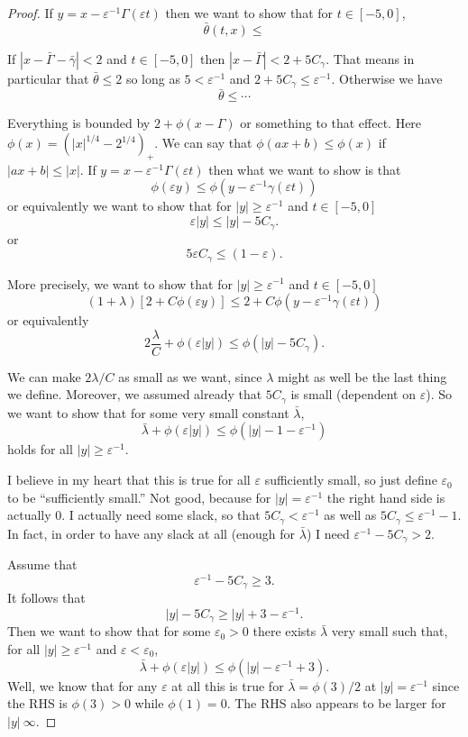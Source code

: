 \documentclass[11pt]{amsart}
\theoremstyle{remark}
\newcommand{\eps}{\varepsilon}
\newcommand{\bracket}[1]{\left[ #1 \right]}
\newcommand{\n}{^{-1}}
\begin{document}
\begin{proof}
If $y = x - \eps\n \Gamma(\eps t)$ then we want to show that for $t \in [-5,0]$,
\[ \bar{\theta}(t,x) \leq  \]

If $|x - \bar{\Gamma}-\bar{\gamma}| < 2$ and $t \in [-5,0]$ then $|x - \bar{\Gamma}| < 2 + 5 C_\gamma$.  That means in particular that $\bar{\theta} \leq 2$ so long as $5 < \eps\n$ and $2 + 5 C_\gamma \leq \eps\n$.  Otherwise we have
\[ \bar{\theta} \leq \cdots \]

Everything is bounded by $2 + \phi(x-\Gamma)$ or something to that effect.  Here $\phi(x) = (|x|^{1/4} - 2^{1/4})_+$.  We can say that $\phi(ax+b) \leq \phi(x)$ if $|ax+b| \leq |x|$.  If $y = x - \eps\n \Gamma(\eps t)$ then what we want to show is that
\[ \phi(\eps y) \leq \phi(y - \eps\n \gamma(\eps t)) \]
or equivalently we want to show that for $|y| \geq \eps\n$ and $t \in [-5,0]$
\[ \eps |y| \leq |y| - 5 C_\gamma. \]
or
\[ 5 \eps C_\gamma \leq (1-\eps). \]

More precisely, we want to show that for $|y| \geq \eps\n$ and $t \in [-5,0]$
\[ (1+\lambda) \bracket{2 + C \phi(\eps y)} \leq 2 + C \phi(y - \eps\n\gamma(\eps t)) \]
or equivalently
\[ 2 \frac{\lambda}{C} + \phi(\eps |y|) \leq \phi(|y| - 5 C_\gamma). \]

We can make $2 \lambda/C$ as small as we want, since $\lambda$ might as well be the last thing we define.  Moreover, we assumed already that $5 C_\gamma$ is small (dependent on $\eps$).  So we want to show that for some very small constant $\bar{\lambda}$,
\[ \bar{\lambda} + \phi(\eps |y|) \leq \phi(|y| - 1 - \eps\n) \]
holds for all $|y| \geq \eps\n$.  

I believe in my heart that this is true for all $\eps$ sufficiently small, so just define $\eps_0$ to be ``sufficiently small.''  Not good, because for $|y|=\eps\n$ the right hand side is actually 0.  I actually need some slack, so that $5 C_\gamma < \eps\n$ as well as $5 C_\gamma \leq \eps\n - 1$.  In fact, in order to have any slack at all (enough for $\bar{\lambda}$) I need $\eps\n - 5 C_\gamma > 2$.  

Assume that
\[ \eps\n - 5 C_\gamma \geq 3. \]
It follows that
\[ |y| - 5 C_\gamma \geq |y| + 3 - \eps\n. \]
Then we want to show that for some $\eps_0 > 0$ there exists $\bar{\lambda}$ very small such that, for all $|y| \geq \eps\n$ and $\eps < \eps_0$,
\[ \bar{\lambda} + \phi(\eps |y|) \leq \phi(|y| - \eps\n + 3). \]
Well, we know that for any $\eps$ at all this is true for $\bar{\lambda} = \phi(3)/2$ at $|y| = \eps\n$ since the RHS is $\phi(3) > 0$ while $\phi(1)=0$.  The RHS also appears to be larger for $|y| ~ \infty$.  


\end{proof}
\end{document}
